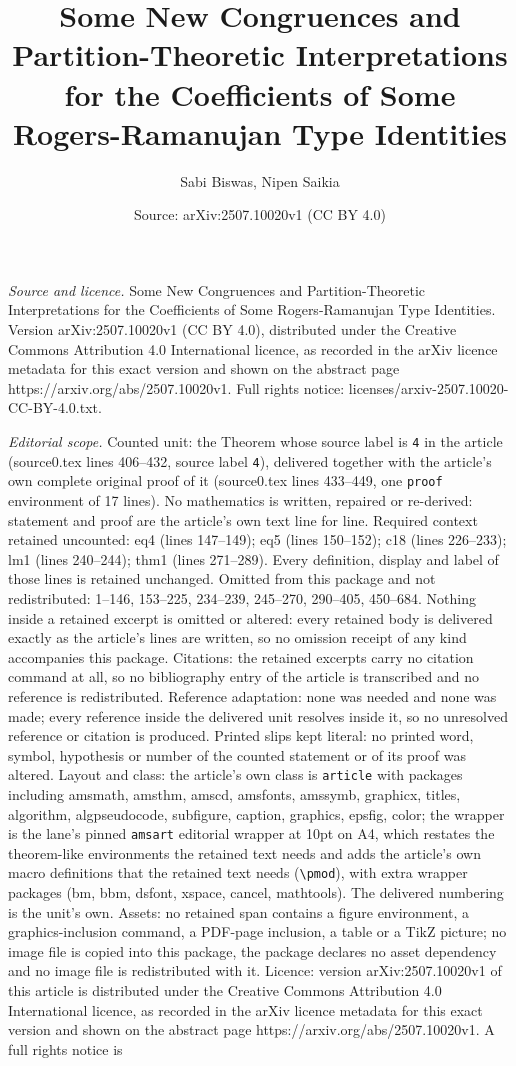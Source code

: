 \documentclass[10pt,a4paper]{amsart}
\title[Some New Congruences and Partition-Theoretic Interpretations]{Some New Congruences and Partition-Theoretic Interpretations for the Coefficients of Some Rogers-Ramanujan Type Identities}
\author{Sabi Biswas, Nipen Saikia}
\date{Source: arXiv:2507.10020v1 (CC BY 4.0)}
\begin{document}
\maketitle

\noindent\emph{Source and licence.} Some New Congruences and Partition-Theoretic Interpretations for the Coefficients of Some Rogers-Ramanujan Type Identities. Version arXiv:2507.10020v1 (CC BY 4.0), distributed under the Creative Commons Attribution 4.0 International licence, as recorded in the arXiv licence metadata for this exact version and shown on the abstract page https://arxiv.org/abs/2507.10020v1. Full rights notice: licenses/arxiv-2507.10020-CC-BY-4.0.txt.\par\smallskip

\noindent\textit{Editorial scope.} Counted unit: the Theorem whose source label is \texttt{4} in the article (source0.tex lines 406--432, source label \texttt{4}), delivered together with the article's own complete original proof of it (source0.tex lines 433--449, one \texttt{proof} environment of 17 lines). No mathematics is written, repaired or re-derived: statement and proof are the article's own text line for line. Required context retained uncounted: eq4 (lines 147--149); eq5 (lines 150--152); c18 (lines 226--233); lm1 (lines 240--244); thm1 (lines 271--289). Every definition, display and label of those lines is retained unchanged. Omitted from this package and not redistributed: 1--146, 153--225, 234--239, 245--270, 290--405, 450--684. Nothing inside a retained excerpt is omitted or altered: every retained body is delivered exactly as the article's lines are written, so no omission receipt of any kind accompanies this package. Citations: the retained excerpts carry no citation command at all, so no bibliography entry of the article is transcribed and no reference is redistributed. Reference adaptation: none was needed and none was made; every reference inside the delivered unit resolves inside it, so no unresolved reference or citation is produced. Printed slips kept literal: no printed word, symbol, hypothesis or number of the counted statement or of its proof was altered. Layout and class: the article's own class is \texttt{article} with packages including amsmath, amsthm, amscd, amsfonts, amssymb, graphicx, titles, algorithm, algpseudocode, subfigure, caption, graphics, epsfig, color; the wrapper is the lane's pinned \texttt{amsart} editorial wrapper at 10pt on A4, which restates the theorem-like environments the retained text needs and adds the article's own macro definitions that the retained text needs (\texttt{\textbackslash pmod}), with extra wrapper packages (bm, bbm, dsfont, xspace, cancel, mathtools). The delivered numbering is the unit's own. Assets: no retained span contains a figure environment, a graphics-inclusion command, a PDF-page inclusion, a table or a TikZ picture; no image file is copied into this package, the package declares no asset dependency and no image file is redistributed with it. Licence: version arXiv:2507.10020v1 of this article is distributed under the Creative Commons Attribution 4.0 International licence, as recorded in the arXiv licence metadata for this exact version and shown on the abstract page https://arxiv.org/abs/2507.10020v1. A full rights notice is 
\end{document}
